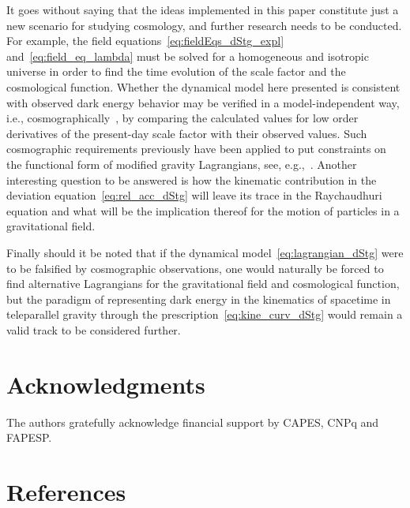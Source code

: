 \documentclass[%
5p,
times,
sort&compress
]{elsarticle}
\begin{document}
It goes without saying that the ideas implemented in this paper 
constitute just a new scenario for studying cosmology,
and further research needs to be conducted. For example, the 
field equations~\eqref{eq:fieldEqs_dStg_expl} 
and~\eqref{eq:field_eq_lambda} must be solved for a homogeneous 
and isotropic universe in order to find the time evolution of the 
scale factor and the cosmological function. Whether the dynamical 
model here presented is consistent with observed dark energy 
behavior may be verified in a model-independent way, i.e.,  
cosmographically~\cite{Visser:2004bf}, by comparing the 
calculated values for low order derivatives of the present-day 
scale factor with their observed values. Such cosmographic 
requirements previously have been applied to put constraints on 
the functional form of modified gravity Lagrangians, see, 
e.g.,~\cite{Capozziello:2015rda}. Another interesting question to 
be answered is how the kinematic contribution in the deviation 
equation~\eqref{eq:rel_acc_dStg} will leave its trace in the 
Raychaudhuri equation and what will be the implication thereof 
for the motion of particles in a gravitational field.

Finally should it be noted that if the dynamical 
model~\eqref{eq:lagrangian_dStg} were to be falsified by 
cosmographic observations, one would naturally be forced to find 
alternative Lagrangians for the gravitational field and 
cosmological function, but the paradigm of representing dark 
energy in the kinematics of spacetime in tele\-parallel gravity 
through the prescription~\eqref{eq:kine_curv_dStg} would remain 
a valid track to be considered further.

\section*{Acknowledgments}

The authors gratefully acknowledge financial support by CAPES, 
CNPq and FAPESP.

\section*{References}



\end{document}
